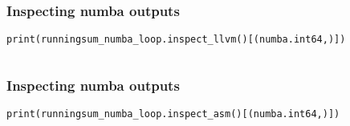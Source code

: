 \documentclass[serif]{beamer}
\begin{document}
\begin{frame}[fragile]
  \frametitle{Inspecting numba outputs}

  \begin{verbatim}
print(runningsum_numba_loop.inspect_llvm()[(numba.int64,)])
  \end{verbatim}
  \tiny
  \inputminted{llvm}{inspect_llvm.txt}
\end{frame}

\begin{frame}[fragile]
  \frametitle{Inspecting numba outputs}

  \begin{verbatim}
print(runningsum_numba_loop.inspect_asm()[(numba.int64,)])
  \end{verbatim}
  \tiny
  \inputminted{asm}{inspect_asm.txt}
\end{frame}
\end{document}
